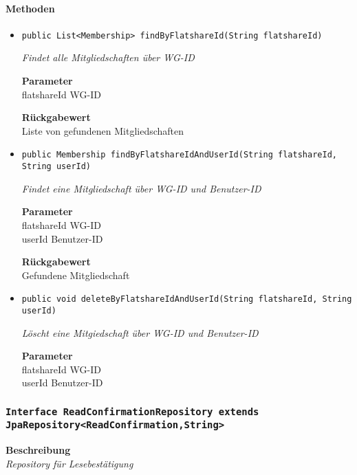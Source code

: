     \paragraph*{Methoden}
    \begin{itemize}
    	\item{\texttt{public List<Membership> findByFlatshareId(String flatshareId)}}
    	
    	\textit{Findet alle Mitgliedschaften über WG-ID}
    	
    	\textbf{Parameter} \\
    	flatshareId WG-ID
    	
    	\textbf{Rückgabewert} \\
    	Liste von gefundenen Mitgliedschaften        \item{\texttt{public Membership findByFlatshareIdAndUserId(String flatshareId, String userId)}}
    	
    	\textit{Findet eine Mitgliedschaft über WG-ID und Benutzer-ID}
    	
    	\textbf{Parameter} \\
    	flatshareId WG-ID\\
    	userId Benutzer-ID
    	
    	\textbf{Rückgabewert} \\
    	Gefundene Mitgliedschaft        \item{\texttt{public void deleteByFlatshareIdAndUserId(String flatshareId, String userId)}}
    	
    	\textit{Löscht eine Mitgiedschaft über WG-ID und Benutzer-ID}
    	
    	\textbf{Parameter} \\
    	flatshareId WG-ID\\
    	userId Benutzer-ID
    	
    	
    \end{itemize}
    \subsubsection{\texttt{Interface ReadConfirmationRepository extends JpaRepository<ReadConfirmation,String>}}
    \textbf{Beschreibung} \\
    \textit{Repository für Lesebestätigung}
